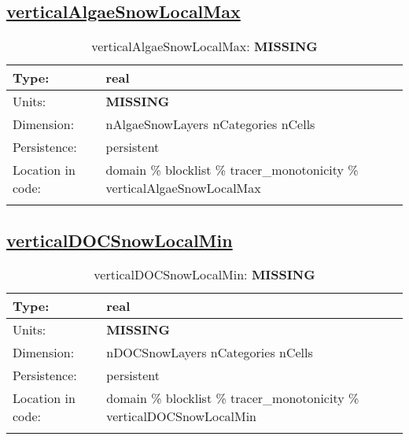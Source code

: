 \subsection[verticalAlgaeSnowLocalMax]{\hyperref[sec:var_tab_tracer_monotonicity]{verticalAlgaeSnowLocalMax}}
\label{subsec:var_sec_tracer_monotonicity_verticalAlgaeSnowLocalMax}
\begin{center}
\begin{longtable}{| p{2.0in} | p{4.0in} |}
        \hline 
        Type: & real \\
        \hline 
        Units: & {\bf \color{red} MISSING} \\
        \hline 
        Dimension: & nAlgaeSnowLayers nCategories nCells \\
        \hline 
        Persistence: & persistent \\
        \hline 
         Location in code: & domain \% blocklist \% tracer\_monotonicity \% verticalAlgaeSnowLocalMax \\
         \hline 
    \caption{verticalAlgaeSnowLocalMax: {\bf \color{red} MISSING}}
\end{longtable}
\end{center}
\subsection[verticalDOCSnowLocalMin]{\hyperref[sec:var_tab_tracer_monotonicity]{verticalDOCSnowLocalMin}}
\label{subsec:var_sec_tracer_monotonicity_verticalDOCSnowLocalMin}
\begin{center}
\begin{longtable}{| p{2.0in} | p{4.0in} |}
        \hline 
        Type: & real \\
        \hline 
        Units: & {\bf \color{red} MISSING} \\
        \hline 
        Dimension: & nDOCSnowLayers nCategories nCells \\
        \hline 
        Persistence: & persistent \\
        \hline 
         Location in code: & domain \% blocklist \% tracer\_monotonicity \% verticalDOCSnowLocalMin \\
         \hline 
    \caption{verticalDOCSnowLocalMin: {\bf \color{red} MISSING}}
\end{longtable}
\end{center}
